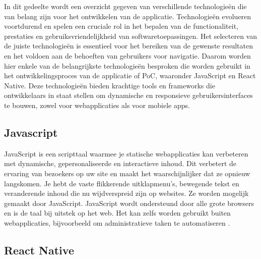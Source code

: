 In dit gedeelte wordt een overzicht gegeven van verschillende technologieën die van belang zijn voor het ontwikkelen van de applicatie. Technologieën evolueren voortdurend en spelen een cruciale rol in het bepalen van de functionaliteit, prestaties en gebruiksvriendelijkheid van softwaretoepassingen. Het selecteren van de juiste technologieën is essentieel voor het bereiken van de gewenste resultaten en het voldoen aan de behoeften van gebruikers voor navigatie. Daarom worden hier enkele van de belangrijkste technologieën besproken die worden gebruikt in het ontwikkelingsproces van de applicatie of PoC, waaronder JavaScript en React Native. Deze technologieën bieden krachtige tools en frameworks die ontwikkelaars in staat stellen om dynamische en responsieve gebruikersinterfaces te bouwen, zowel voor webapplicaties als voor mobiele apps.

\subsection{Javascript}
\label{sec:javascript}

JavaScript is een scripttaal waarmee je statische webapplicaties kan verbeteren met dynamische, gepersonaliseerde en interactieve inhoud. Dit verbetert de ervaring van bezoekers op uw site en maakt het waarschijnlijker dat ze opnieuw langskomen. Je hebt de vaste flikkerende uitklapmenu's, bewegende tekst en veranderende inhoud die nu wijdverspreid zijn op websites. Ze worden mogelijk gemaakt door JavaScript. JavaScript wordt ondersteund door alle grote browsers en is de taal bij uitstek op het web. Het kan zelfs worden gebruikt buiten webapplicaties, bijvoorbeeld om administratieve taken te automatiseren \autocite{Wilton2004}.

\subsection{React Native}
\label{sec:react native}

